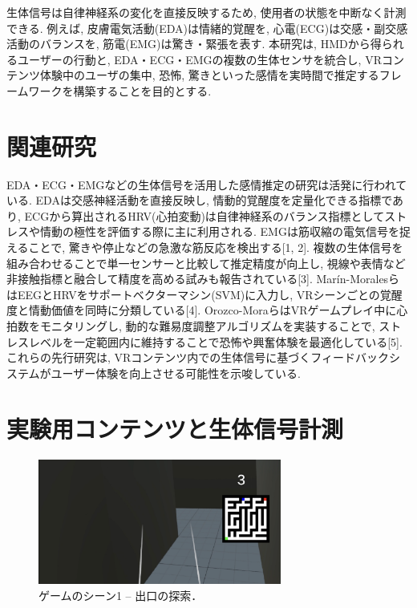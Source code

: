 \documentclass[a4paper]{jarticle}
\begin{document}
生体信号は自律神経系の変化を直接反映するため, 使用者の状態を中断なく計測できる. 例えば, 皮膚電気活動(EDA)は情緒的覚醒を, 心電(ECG)は交感・副交感活動のバランスを, 筋電(EMG)は驚き・緊張を表す. 本研究は, HMDから得られるユーザーの行動と, EDA・ECG・EMGの複数の生体センサを統合し, VRコンテンツ体験中のユーザの集中, 恐怖, 驚きといった感情を実時間で推定するフレームワークを構築することを目的とする.

\section{関連研究}%

EDA・ECG・EMGなどの生体信号を活用した感情推定の研究は活発に行われている. EDAは交感神経活動を直接反映し, 情動的覚醒度を定量化できる指標であり, ECGから算出されるHRV(心拍変動)は自律神経系のバランス指標としてストレスや情動の極性を評価する際に主に利用される. EMGは筋収縮の電気信号を捉えることで, 驚きや停止などの急激な筋反応を検出する[1, 2]. 複数の生体信号を組み合わせることで単一センサーと比較して推定精度が向上し, 視線や表情など非接触指標と融合して精度を高める試みも報告されている[3]. Marín-MoralesらはEEGとHRVをサポートベクターマシン(SVM)に入力し, VRシーンごとの覚醒度と情動価値を同時に分類している[4]. Orozco-MoraらはVRゲームプレイ中に心拍数をモニタリングし, 動的な難易度調整アルゴリズムを実装することで, ストレスレベルを一定範囲内に維持することで恐怖や興奮体験を最適化している[5]. これらの先行研究は, VRコンテンツ内での生体信号に基づくフィードバックシステムがユーザー体験を向上させる可能性を示唆している.

\section{実験用コンテンツと生体信号計測}%

\begin{figure}[tp]
  \begin{center}
    \includegraphics*[width=80mm]{game1.png}
  \end{center}
  \vspace*{-6mm}
  \caption{ゲームのシーン1 -- 出口の探索．}
  \label{figure1}
\end{figure}
\end{document}
